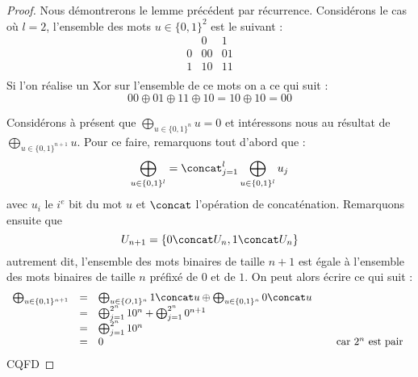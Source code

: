 \documentclass[a4paper,11pt]{article}
\begin{document}
\begin{proof}
    Nous démontrerons le lemme précédent par récurrence. Considérons le cas où $l = 2$, l'ensemble
    des mots $u \in \{0,1\}^2$ est le suivant :
    \begin{displaymath}
        \begin{array}{c|cc}
            & 0 & 1 \\ \hline
            0 & 00 & 01 \\ 
            1 & 10 & 11 \\
        \end{array}
    \end{displaymath}
    Si l'on réalise un Xor sur l'ensemble de ce mots on a ce qui suit :
    \begin{displaymath}
        00 \oplus 01 \oplus 11 \oplus 10 = 10 \oplus 10 = 00
    \end{displaymath}

    Considérons à présent que $\bigoplus_{u \in \{0,1\}^n} u = 0$ et intéressons nous au résultat de
    $\bigoplus_{u \in \{0,1\}^{n+1}} u$. Pour ce faire, remarquons tout d'abord que : 
    \begin{displaymath}
        \bigoplus_{u \in \{0,1\}^l} = \concat_{j = 1}^{l} \bigoplus_{u \in \{0,1\}^l} u_j
    \end{displaymath}
    avec $u_i$ le $i^e$ bit du mot $u$ et $\concat$ l'opération de concaténation. Remarquons ensuite
    que \begin{displaymath}
        U_{n+1} = \{0 \concat U_n, 1 \concat U_n\}
    \end{displaymath}
    autrement dit, l'ensemble des mots binaires de taille $n+1$ est égale à l'ensemble des mots
    binaires de taille $n$ préfixé de $0$ et de $1$. On peut alors écrire ce qui suit :
    \begin{displaymath}
        \begin{array}{rcll}
            \bigoplus_{u \in \{0,1\}^{n+1}} & = & \bigoplus_{u \in \{O,1\}^n} 1 \concat u \oplus \bigoplus_{u \in \{0,1\}^n} 0 \concat u & \\
                                            & = & \bigoplus_{j = 1}^{2^n} 10^n + \bigoplus_{j=1}^{2^n} 0^{n+1} & \\
                                            & = & \bigoplus_{j = 1}^{2^n} 10^n & \\
                                            & = & 0 & \quad \mbox{ car }2^n\mbox{ est pair }\\
        \end{array}
    \end{displaymath}
    CQFD
\end{proof}
\end{document}
